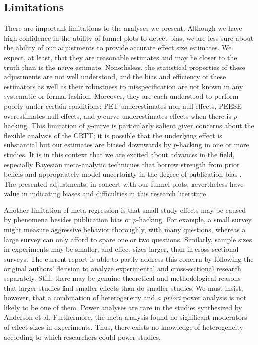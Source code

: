 \documentclass[man, mask]{apa6}
\begin{document}
\subsection{Limitations}
There are important limitations to the analyses we present.  Although we have high confidence in the ability of funnel plots to detect bias, we are less sure about the ability of our adjustments to provide accurate effect size estimates.  We expect, at least, that they are reasonable estimates and may be closer to the truth than is the na{\"i}ve estimate.  Nonetheless, the statistical properties of these adjustments are not well understood, and the bias and efficiency of these estimators as well as their robustness to misspecification are not known in any systematic or formal fashion.  Moreover, they are each understood to perform poorly under certain conditions: PET underestimates non-null effects, PEESE overestimates null effects, and $p$-curve underestimates effects when there is $p$-hacking. This limitation of $p$-curve is particularly salient given concerns about the flexible analysis of the CRTT; it is possible that the underlying effect is substantial but our estimates are biased downwards by $p$-hacking in one or more studies.  %
It is in this context that we are excited about advances in the field, especially Bayesian meta-analytic techniques that borrow strength from prior beliefs and appropriately model uncertainty in the degree of publication bias \citep{Guan:Vandekerckhove:2015}. The presented adjustments, in concert with our funnel plots, nevertheless have value in indicating biases and difficulties in this research literature. 

Another limitation of meta-regression is that small-study effects may be caused by phenomena besides publication bias or $p$-hacking. For example, a small survey might measure aggressive behavior thoroughly, with many questions, whereas a large survey can only afford to spare one or two questions. Similarly, sample sizes in experiments may be smaller, and effect sizes larger, than in cross-sectional surveys. The current report is able to partly address this concern by following the original authors' decision to analyze experimental and cross-sectional research separately. Still, there may be genuine theoretical and methodological reasons that larger studies find smaller effects than do smaller studies. We must insist, however, that a combination of heterogeneity and {\em a priori} power analysis is not likely to be one of them. Power analyses are rare in the studies synthesized by Anderson et al. Furthermore, the meta-analysis found no significant moderators of effect sizes in experiments. Thus, there exists no knowledge of heterogeneity according to which researchers could power studies.  
\end{document}
